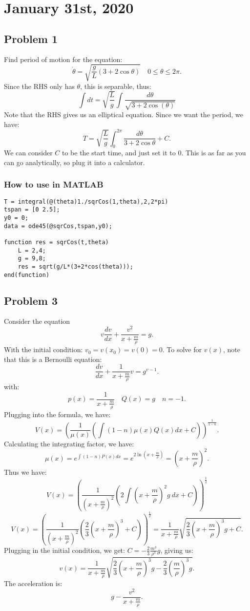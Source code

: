\documentclass[../main/main.tex]{subfiles}
\begin{document}
\section{January 31st, 2020}
\subsection{Problem 1}
Find period of motion for the equation: \[
	\dot{\theta}= \sqrt{\frac{g}{L}(3+2\cos\theta)}\quad 0\le \theta\le 2\pi
.\] Since the RHS only has $\theta$, this is separable, thus:  \[
\int	dt=\sqrt{\frac{L}{g}}\int \frac{d\theta}{\sqrt{3+2\cos(\theta)} }
\] Note that the RHS gives us an elliptical equation. Since we want the period, we have: \[
T = \sqrt{\frac{L}{g}} \int_0^{2\pi} \frac{d\theta}{3+2\cos\theta}+C
.\] We can consider $C$ to be the start time, and just set it to 0. This is as far as you can go analytically, so plug it into a calculator. 
\subsubsection{How to use in MATLAB}
\begin{lstlisting}
T = integral(@(theta)1./sqrCos(1,theta),2,2*pi)
tspan = [0 2.5];
y0 = 0;
data = ode45(@sqrCos,tspan,y0);

function res = sqrCos(t,theta)
	L = 2,4;
	g = 9,8;
	res = sqrt(g/L*(3+2*cos(theta)));
end(function)
\end{lstlisting}
\subsection{Problem 3}
Consider the equation  \[
v \frac{dv}{dx}+\frac{v^2}{x+\frac{m}{\rho}}=g
.\] With the initial condition: $v_0=v(x_0)=v(0)=0$. To solve for $v(x)$, note that this is a Bernoulli equation: \[
\frac{dv}{dx}+\frac{1}{x+\frac{m}{\rho}}v=g^{v-1}
.\] with: \[
p(x) = \frac{1}{x+\frac{m}{\rho}}\quad Q(x)=g \quad n=-1
.\] Plugging into the formula, we have: \[
V(x) = \left( \frac{1}{\mu(x)}\left( \int(1-n)\mu(x)Q(x)dx+C \right)  \right) ^{\frac{1}{1-n}}
.\] Calculating the integrating factor, we have: \[
\mu(x) = e^{\int (1-n) P(x) dx} = e^{2 \ln(x+\frac{m}{\rho})} = \left(x+\frac{m}{\rho}\right)^2
.\] Thus we have: \[ 
V(x) = \left( \frac{1}{\left(x+\frac{m}{\rho}\right)^2}\left( 2\int\left( x+\frac{m}{\rho} \right) ^{2}g~dx+C \right)  \right) ^{\frac{1}{2}}
\]\[ 
V(x) = \left( \frac{1}{\left(x+\frac{m}{\rho}\right)^2}\left( \frac{2}{3}\left( x+\frac{m}{\rho} \right) ^{3} +C \right)  \right) ^{\frac{1}{2}} = \frac{1}{x+\frac{m}{\rho}} \sqrt{\frac{2}{3}\left( x+\frac{m}{\rho} \right)^{3}g+C } 
.\]  Plugging in the initial condition, we get: $C=-\frac{2}{3}\frac{m^{3}}{\rho^{3}}g$, giving us: \[
v(x)=  \frac{1}{x+\frac{m}{\rho}}\sqrt{\frac{2}{3}\left( x+\frac{m}{\rho} \right) ^{3}g- \frac{2}{3}\left( \frac{m}{\rho} \right) ^{3}g} 
.\] The acceleration is: \[
g- \frac{v^2}{x+\frac{m}{\rho}}
.\] 
\end{document}
